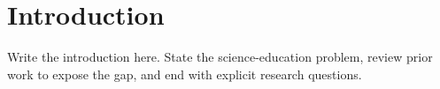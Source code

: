 \section{Introduction}\label{sec:introduction}


Write the introduction here. State the science-education problem, review prior
work to expose the gap, and end with explicit research questions.

